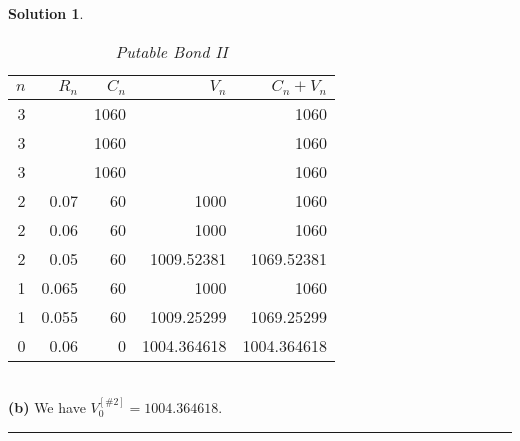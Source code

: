 \documentclass[a4paper, 10pt]{article}
\renewcommand{\arraystretch}{1.4}
\theoremstyle{definition}
\theoremstyle{hSol}
\newtheorem*{solution}{Solution}
\begin{document}
\begin{solution}
\begin{table}[H]
  \centering
  \caption{\textit{Putable Bond II}}
  \vspace{-7pt}
  \def\arraystretch{1.15}
  \begin{tabular}{|r|rrrr|}
  \hline
  $n$ & $R_n$ & $C_n$ & $V_n$ & $C_n+V_n$\\
    \hline
    3     &       & 1060  &       & 1060 \\
    3     &       & 1060  &       & 1060 \\
    3     &       & 1060  &       & 1060 \\
    \hline
    2     & 0.07  & 60    & 1000  & 1060 \\
    2     & 0.06  & 60    & 1000  & 1060 \\
    2     & 0.05  & 60    & 1009.52381 & 1069.52381 \\
    \hline
    1     & 0.065 & 60    & 1000  & 1060 \\
    1     & 0.055 & 60    & 1009.25299 & 1069.25299 \\
    \hline
    0     & 0.06  & 0     & 1004.364618 & 1004.364618 \\
    \hline
    \end{tabular}%
  \label{tab:pb2}%
\end{table}%
~\\ 
\textbf{(b)} We have $V_0^{[\#2]} = 1004.364618$.\\


\end{solution}

\noindent\rule{16cm}{0.4pt}
\end{document}

